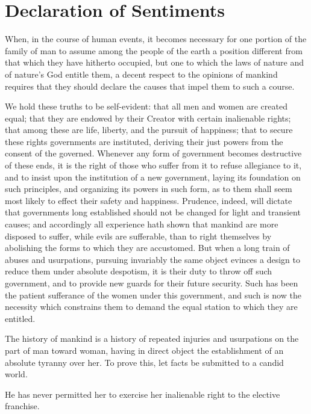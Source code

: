 
\author{Elizabeth Cady Stanton}
\chapter{Declaration of Sentiments}

\noindent When, in the course of human events, it becomes
necessary for one portion of the family of man to assume among the
people of the earth a position different from that which they have
hitherto occupied, but one to which the laws of nature and of nature's
God entitle them, a decent respect to the opinions of mankind requires
that they should declare the causes that impel them to such a course.

We hold these truths to be self-evident: that all men and women are
created equal; that they are endowed by their Creator with certain
inalienable rights; that among these are life, liberty, and the
pursuit of happiness; that to secure these rights governments are
instituted, deriving their just powers from the consent of the
governed. Whenever any form of government becomes destructive of these
ends, it is the right of those who suffer from it to refuse allegiance
to it, and to insist upon the institution of a new government, laying
its foundation on such principles, and organizing its powers in such
form, as to them shall seem most likely to effect their safety and
happiness. Prudence, indeed, will dictate that governments long
established should not be changed for light and transient causes; and
accordingly all experience hath shown that mankind are more disposed
to suffer, while evils are sufferable, than to right themselves by
abolishing the forms to which they are accustomed. But when a long
train of abuses and usurpations, pursuing invariably the same object
evinces a design to reduce them under absolute despotism, it is their
duty to throw off such government, and to provide new guards for their
future security. Such has been the patient sufferance of the women
under this government, and such is now the necessity which constrains
them to demand the equal station to which they are entitled.

The history of mankind is a history of repeated injuries and
usurpations on the part of man toward woman, having in direct object
the establishment of an absolute tyranny over her. To prove this, let
facts be submitted to a candid world.

He has never permitted her to exercise her inalienable right to the
elective franchise.

